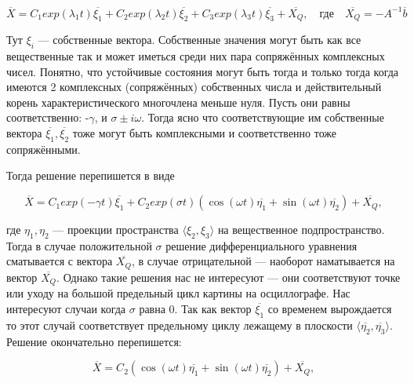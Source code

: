 \documentclass[12pt]{article}
\begin{document}
\begin{equation}
	\overline{X} = C_1 exp(\lambda_1t)\overline{\xi_1} +  C_2 exp(\lambda_2t)\overline{\xi_2}  + C_3 exp(\lambda_3t)\overline{\xi_3} + \overline{X_Q}, \quad \text{где} \quad \overline{X_Q} = -A^{-1}\overline{b}
\end{equation}

Тут $\xi_i$ --- собственные вектора. 
Собственные значения могут быть как все вещественные так и может иметься среди 
них пара сопряжённых комплексных чисел. Понятно, что устойчивые состояния могут быть 
тогда и только тогда когда имеются 2 комплексных (сопряжённых) собственных числа и действительный 
корень характеристического многочлена меньше нуля. Пусть они равны соответственно: -$\gamma$, и $\sigma \pm i\omega$. 
Тогда ясно что соответствующие им собственные вектора $\overline{\xi_1}, \overline{\xi_2}$ тоже могут быть 
комплексными и соответственно тоже сопряжёнными.

Тогда решение перепишется в виде

\begin{equation}
	\overline{X} = C_1 exp(-\gamma t) \overline{\xi_1} +  C_2 exp(\sigma t) \left(\cos(\omega t)\overline{\eta_1} + \sin(\omega t)\overline{\eta_2}  \right) + \overline{X_Q},
\end{equation}

где $\eta_1, \eta_2$  --- проекции пространства $\langle \xi_2, \xi_3 \rangle $ на вещественное подпространство.
Тогда в случае положительной $\sigma$ решение дифференциального уравнения сматывается с вектора $\overline{X_Q}$, в случае отрицательной --- наоборот наматывается на вектор $\overline{X_Q}$. Однако такие решения нас не интересуют --- они соответствуют точке или уходу на большой предельный цикл картины на осциллографе. Нас интересуют случаи когда  $\sigma$ равна 0.  Так как вектор $\overline{\xi_1}$ со временем вырождается то этот случай соответствует предельному циклу лежащему в плоскости $\langle \overline{\eta_2}, \overline{\eta_3} \rangle $.  Решение окончательно перепишется:


\begin{equation}
	\overline{X} =  C_2 \left( \cos(\omega t)\overline{\eta_1} + \sin(\omega t)\overline{\eta_2} \right) + \overline{X_Q},
\end{equation}
\end{document}
